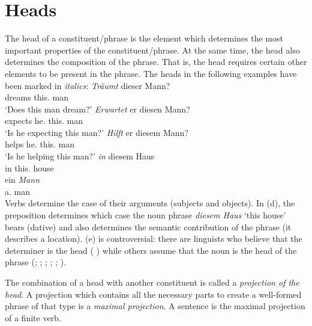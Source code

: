 \section{Heads}
\label{Abschnitt-Kopf}

The head of a constituent/phrase is the element which determines the most important
properties of the constituent/phrase. At the same time, the head also determines the composition of the
phrase. That is, the head requires certain other elements to be present in the phrase. The heads in the following
examples have been marked in \emph{italics}:
\eal
\ex 
\gll \emph{Träumt} dieser Mann?\\
     dreams this.\nom{} man\\
\glt `Does this man dream?'
\ex 
\gll \emph{Erwartet} er diesen Mann?\\
	 expects he.\nom{} this.\acc{} man\\
\glt `Is he expecting this man?'
\ex 
\gll \emph{Hilft} er diesem Mann?\\
	 helps he.\nom{} this.\dat{} man\\
\glt `Is he helping this man?'
\ex 
\gll \emph{in} diesem Haus\\
	 in this.\dat{} house\\
\ex 
\gll ein \emph{Mann}\\
	 a.\nom{} man\\
\zl
Verbs determine the case of their arguments (subjects and objects). In (d), the preposition determines which case the noun phrase \emph{diesem Haus} `this house'
bears (dative) and also determines the semantic contribution of the phrase (it describes a location). (e) is controversial: there are linguists who believe that the
determiner is the head (\citealp{VH77a-u,Hellan86a,Abney87a,Netter94,Netter98a}%
) while others assume that the noun is the head of the phrase (\citealp{vanLangendonck94a}; \citealp[]{ps2}; \citealp{Demske2001a};
\citealp[Section~6.6.1]{MuellerLehrbuch1}; \citealp{Hudson2004a}; \citealp{Bruening2009a}).


The combination of a head with another constituent is called a \emph{projection
of the head}. A projection which contains all the necessary parts to create a well-formed phrase of that type
is a \emph{maximal projection}. A sentence is the maximal projection of a finite verb.

